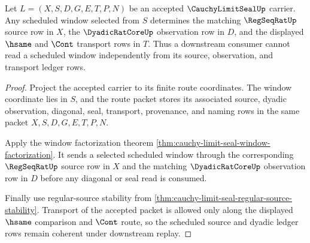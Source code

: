 \begin{theorem}
\label{thm:cauchy-limit-seal-source-schedule-ledger-coherence}
Let $L=(X,S,D,G,E,T,P,N)$ be an accepted $\CauchyLimitSealUp$ carrier. Any scheduled window selected from $S$ determines the matching $\RegSeqRatUp$ source row in $X$, the $\DyadicRatCoreUp$ observation row in $D$, and the displayed $\hsame$ and $\Cont$ transport rows in $T$. Thus a downstream consumer cannot read a scheduled window independently from its source, observation, and transport ledger rows.
\end{theorem}
\begin{proof}
Project the accepted carrier to its finite route coordinates. The window coordinate lies in $S$, and the route packet stores its associated source, dyadic observation, diagonal, seal, transport, provenance, and naming rows in the same packet $X,S,D,G,E,T,P,N$.

Apply the window factorization theorem \autoref{thm:cauchy-limit-seal-window-factorization}. It sends a selected scheduled window through the corresponding $\RegSeqRatUp$ source row in $X$ and the matching $\DyadicRatCoreUp$ observation row in $D$ before any diagonal or seal read is consumed.

Finally use regular-source stability from \autoref{thm:cauchy-limit-seal-regular-source-stability}. Transport of the accepted packet is allowed only along the displayed $\hsame$ comparison and $\Cont$ route, so the scheduled source and dyadic ledger rows remain coherent under downstream replay.
\end{proof}

